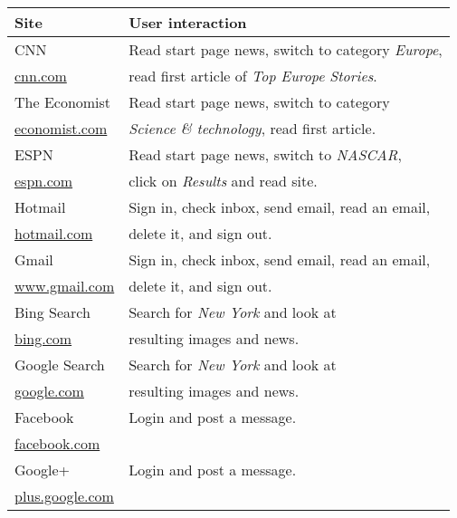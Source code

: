 \begin{table}
	\small
	\centering
	\begin{tabular}{l l}
		\toprule
		\textbf{Site} & \textbf{User interaction} \\ \midrule

		CNN 					& Read start page news, switch to category \textit{Europe}, 			\\ 
		\url{cnn.com} 			& read first article of \textit{Top Europe Stories}. 					\\ \midrule

		The Economist 			& Read start page news, switch to category 								\\ 
		\url{economist.com}		& \textit{Science \& technology}, read first article. 					\\ \midrule

		ESPN 					& Read start page news, switch to \textit{NASCAR}, 		 				\\ 
		\url{espn.com} 			& click on \textit{Results} and read site. 								\\ \midrule

		Hotmail 				& Sign in, check inbox, send email, read an email,						\\ 
		\url{hotmail.com} 		& delete it, and sign out. 												\\ \midrule

		Gmail 					& Sign in, check inbox, send email, read an email, 						\\ 
		\url{www.gmail.com} 	& delete it, and sign out. 												\\ \midrule

		Bing Search 			& Search for \textit{New York} and look at 								\\ 
		\url{bing.com} 			& resulting images and news. 											\\ \midrule

		Google Search 			& Search for \textit{New York} and look at 								\\ 
		\url{google.com}		& resulting images and news. 											\\ \midrule

		Facebook 				& Login and post a message. 											\\ 
		\url{facebook.com} 		&  																		\\ \midrule

		Google+ 				& Login and post a message. 											\\ 
		\url{plus.google.com} 	& 																		\\ \midrule


\end{tabular}
\end{table}
